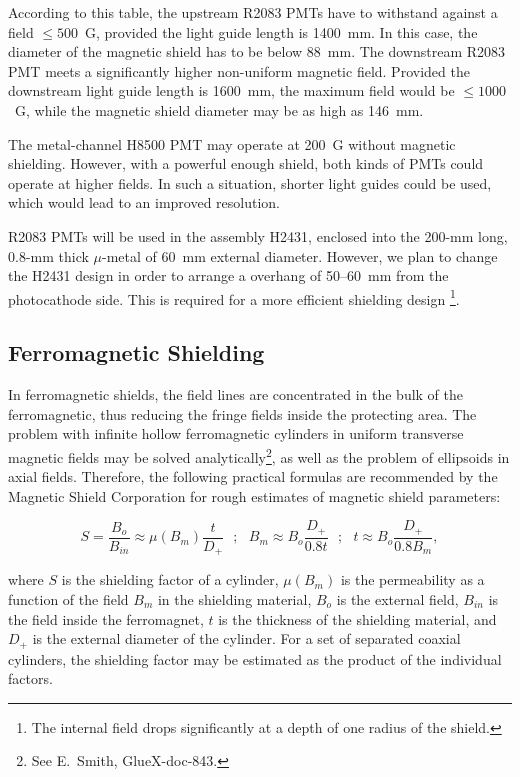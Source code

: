 According to this table, the upstream R2083 PMTs have to withstand against 
a field $\leq 500$~G, provided the light guide length is 1400~mm.  In this case, 
the diameter of the magnetic shield has to be below 88~mm.  The downstream 
R2083 PMT meets a significantly higher non-uniform magnetic field.  Provided 
the downstream light guide length is 1600~mm, the maximum field would be 
$\leq 1000$~G, while the magnetic shield diameter may be as high as 146~mm. 

The metal-channel H8500 PMT may operate at 200~G without magnetic shielding.
However, with a powerful enough shield,  both kinds of PMTs could operate at  
higher fields.  In such a situation, shorter light guides could be used,
which would lead to an improved resolution. 

R2083 PMTs will be used in the assembly H2431, enclosed into the 200-mm long,
0.8-mm thick $\mu$-metal of 60~mm external diameter.  However, we plan to 
change the H2431 design in order to arrange a overhang of 50--60~mm from the 
photocathode side.  This is required for a more efficient shielding design
\footnote{The internal field drops significantly at a depth of one radius of 
the shield.}.

\subsection{Ferromagnetic Shielding}

In ferromagnetic shields, the field lines are concentrated in the bulk of 
the ferromagnetic, thus reducing the fringe fields inside the protecting  
area.  The problem with infinite hollow ferromagnetic cylinders in uniform 
transverse magnetic fields may be solved analytically\footnote{See E.~Smith,
GlueX-doc-843.}, as well as the problem of ellipsoids in axial fields.  
Therefore, the following practical formulas are recommended by the Magnetic 
Shield Corporation for rough estimates of magnetic shield parameters:

\begin{equation}
S = \frac{B_o}{B_{in}}\approx \mu({B_m})\frac{t}{D_+}~~~;
~~~B_m \approx B_o\frac{D_+}{0.8t}~~~;
~~~t\approx B_o\frac{D_+}{0.8B_m},
\label{eq000}
\end{equation}

\noindent
where $S$ is the shielding factor of a cylinder, $\mu(B_m)$ is the 
permeability as a function of the field $B_m$ in the shielding material,
$B_o$ is the external field, $B_{in}$ is the field inside the 
ferromagnet, $t$ is the thickness of the shielding material, and $D_+$ 
is the external diameter of the cylinder.  For a set of separated coaxial 
cylinders, the shielding factor may be estimated as the product of 
the individual factors.

